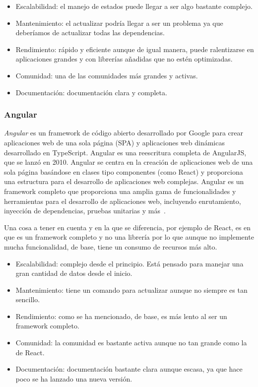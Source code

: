 \begin{itemize}
    \item[\bien] Escalabilidad: el manejo de estados puede llegar a ser algo bastante complejo.
    \item[\regular] Mantenimiento: el actualizar podría llegar a ser un problema ya que deberíamos de actualizar todas las dependencias.
    \item[\regular] Rendimiento: rápido y eficiente aunque de igual manera, puede ralentizarse en aplicaciones grandes y con librerías añadidas que no estén optimizadas.
    \item[\esp] Comunidad: una de las comunidades más grandes y activas.
    \item[\bien] Documentación: documentación clara y completa.
\end{itemize}

\subsubsection{Angular}

\textit{Angular} es un framework de código abierto desarrollado por Google para crear aplicaciones web de una sola página (SPA) y aplicaciones web dinámicas desarrollado en TypeScript. Angular es una reescritura completa de AngularJS, que se lanzó en 2010. Angular se centra en la creación de aplicaciones web de una sola página basándose en clases tipo componentes (como React) y proporciona una estructura para el desarrollo de aplicaciones web complejas. Angular es un framework completo que proporciona una amplia gama de funcionalidades y herramientas para el desarrollo de aplicaciones web, incluyendo enrutamiento, inyección de dependencias, pruebas unitarias y más~\cite{angular-wikipedia}.

Una cosa a tener en cuenta y en la que se diferencia, por ejemplo de React, es en que es un framework completo y no una librería por lo que aunque no implemente mucha funcionalidad, de base, tiene un consumo de recursos más alto.

\begin{itemize}
    \item[\regular] Escalabilidad: complejo desde el principio. Está pensado para manejar una gran cantidad de datos desde el inicio.
    \item[\bien] Mantenimiento: tiene un comando para actualizar aunque no siempre es tan sencillo.
    \item[\regular] Rendimiento: como se ha mencionado, de base, es más lento al ser un framework completo.
    \item[\regular] Comunidad: la comunidad es bastante activa aunque no tan grande como la de React.
    \item[\regular] Documentación: documentación bastante clara aunque escasa, ya que hace poco se ha lanzado una nueva versión.
\end{itemize}

